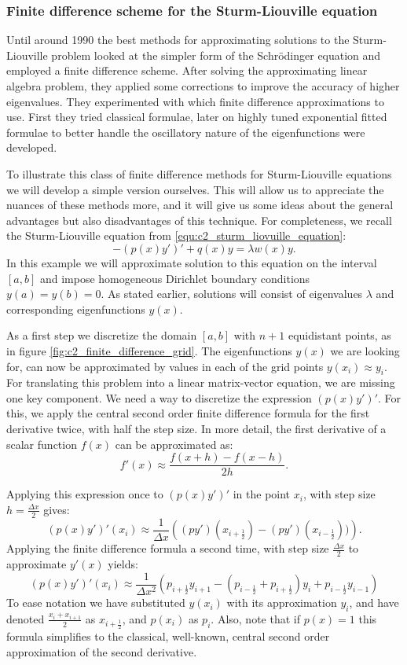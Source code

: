 \subsubsection{Finite difference scheme for the Sturm-Liouville equation}

Until around 1990 the best methods \cite{andrew_correction_1985,vandenberghe_accurate_1991} for approximating solutions to the Sturm-Liouville problem looked at the simpler form of the Schrödinger equation and employed a finite difference scheme. After solving the approximating linear algebra problem, they applied some corrections to improve the accuracy of higher eigenvalues. They experimented with which finite difference approximations to use. First they tried classical formulae, later on highly tuned exponential fitted formulae to better handle the oscillatory nature of the eigenfunctions were developed.

To illustrate this class of finite difference methods for Sturm-Liouville equations we will develop a simple version ourselves. This will allow us to appreciate the nuances of these methods more, and it will give us some ideas about the general advantages but also disadvantages of this technique. For completeness, we recall the Sturm-Liouville equation from \eqref{equ:c2_sturm_liovuille_equation}:
$$
    -(p(x)y')' + q(x) y = \lambda w(x) y\text{.}
$$
In this example we will approximate solution to this equation on the interval $[a, b]$ and impose homogeneous Dirichlet boundary conditions $y(a) = y(b) = 0$. As stated earlier, solutions will consist of eigenvalues $\lambda$ and corresponding eigenfunctions $y(x)$.

As a first step we discretize the domain $[a, b]$ with $n+1$ equidistant points, as in figure \ref{fig:c2_finite_difference_grid}. The eigenfunctions $y(x)$ we are looking for, can now be approximated by values in each of the grid points $y(x_i) \approx y_i$. For translating this problem into a linear matrix-vector equation, we are missing one key component. We need a way to discretize the expression $(p(x) y')'$. For this, we apply the central second order finite difference formula for the first derivative twice, with half the step size. In more detail, the first derivative of a scalar function $f(x)$ can be approximated as:
$$
    f'(x) \approx \frac{f(x + h) - f(x - h)}{2h}\text{.}
$$

Applying this expression once to $(p(x) y')'$ in the point $x_i$, with step size $h = \frac{\Delta x}{2}$ gives:
$$
    (p(x) y')'(x_i) \approx \frac{1}{\Delta x}\left((p y')\left(x_{i+\frac{1}{2}}\right) - (p y')\left(x_{i-\frac{1}{2}}\right))\right)\text{.}
$$
Applying the finite difference formula a second time, with step size $\frac{\Delta x}{2}$ to approximate $y'(x)$ yields:
$$
    (p(x) y')'(x_i) \approx \frac{1}{\Delta x^2}\left(p_{i+\frac{1}{2}} y_{i+1} - \left(p_{i-\frac{1}{2}} + p_{i+\frac{1}{2}}\right) y_i + p_{i-\frac{1}{2}} y_{i-1}\right)
$$
To ease notation we have substituted $y(x_i)$ with its approximation $y_i$, and have denoted $\frac{x_i + x_{i+1}}{2}$ as $x_{i+\frac{1}{2}}$, and $p(x_i)$ as $p_i$. Also, note that if $p(x) = 1$ this formula simplifies to the classical, well-known, central second order approximation of the second derivative.

